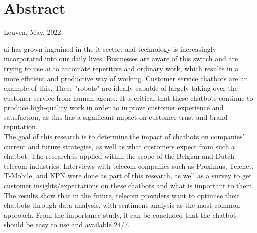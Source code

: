 \chapter*{Abstract\hfill} 
\label{ch:abstract}
\begin{flushright}
	Leuven, May, 2022.
\end{flushright}
\acrfull{ai} has grown ingrained in the \acrshort{it} sector, and technology is increasingly incorporated into our daily lives. Businesses are aware of this switch and are trying to use \acrshort{ai} to automate repetitive and ordinary work, which results in a more efficient and productive way of working. Customer service chatbots are an example of this. These "robots" are ideally capable of largely taking over the customer service from human agents. It is critical that these chatbots continue to produce high-quality work in order to improve customer experience and satisfaction, as this has a significant impact on customer trust and brand reputation.\\
\break
The goal of this research is to determine the impact of chatbots on companies' current and future strategies, as well as what customers expect from such a chatbot. The research is applied within the scope of the Belgian and Dutch telecom industries. Interviews with telecom companies such as Proximus, Telenet, T-Mobile, and KPN were done as part of this research, as well as a survey to get customer insights/expectations on these chatbots and what is important to them.\\
\break
The results show that in the future, telecom providers want to optimise their chatbots through data analysis, with sentiment analysis as the most common approach. From the importance study, it can be concluded that the chatbot should be easy to use and available 24/7.

